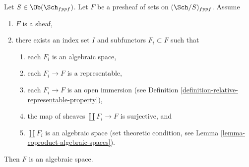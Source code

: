 \begin{lemma}
\label{lemma-glueing-algebraic-spaces}
Let $S \in \Ob(\Sch_{fppf})$.
Let $F$ be a presheaf of sets on $(\Sch/S)_{fppf}$.
Assume
\begin{enumerate}
\item $F$ is a sheaf,
\item there exists an index set $I$
and subfunctors $F_i \subset F$ such that
\begin{enumerate}
\item each $F_i$ is an algebraic space,
\item each $F_i \to F$ is a representable,
\item each $F_i \to F$ is an open immersion (see
Definition \ref{definition-relative-representable-property}),
\item the map of sheaves $\coprod F_i \to F$ is surjective, and
\item $\coprod F_i$ is an algebraic space (set theoretic condition, see
Lemma \ref{lemma-coproduct-algebraic-spaces}).
\end{enumerate}
\end{enumerate}
Then $F$ is an algebraic space.
\end{lemma}

